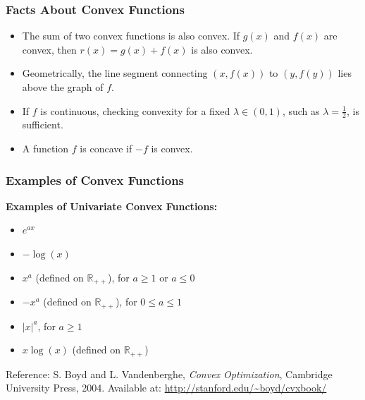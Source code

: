 \begin{frame}
    \frametitle{Facts About Convex Functions}
    \vspace{0.3cm}

    \begin{itemize}
        \item The sum of two convex functions is also convex. If \( g(x) \) and \( f(x) \) are convex, then \( r(x) = g(x) + f(x) \) is also convex.
        \item Geometrically, the line segment connecting \( (x, f(x)) \) to \( (y, f(y)) \) lies above the graph of \( f \).
        \item If \( f \) is continuous, checking convexity for a fixed \( \lambda \in (0,1) \), such as \( \lambda = \frac{1}{2} \), is sufficient.
        \item A function \( f \) is concave if \( -f \) is convex.
    \end{itemize}


\begin{center}
        \textit{\textcolor{gray}{}}
    \end{center}
\end{frame}

\begin{frame}
    \frametitle{Examples of Convex Functions}
    \vspace{0.3cm}

    \textbf{Examples of Univariate Convex Functions:}
    \begin{itemize}
        \item \( e^{ax} \)
        \item \( -\log(x) \)
        \item \( x^a \) (defined on \( \mathbb{R}_{++} \)), for \( a \geq 1 \) or \( a \leq 0 \)
        \item \( -x^a \) (defined on \( \mathbb{R}_{++} \)), for \( 0 \leq a \leq 1 \)
        \item \( |x|^a \), for \( a \geq 1 \)
        \item \( x \log(x) \) (defined on \( \mathbb{R}_{++} \))
    \end{itemize}

    \vspace{0.3cm}

    Reference: S. Boyd and L. Vandenberghe, \textit{Convex Optimization}, Cambridge University Press, 2004. Available at: \url{http://stanford.edu/~boyd/cvxbook/}
\end{frame}



